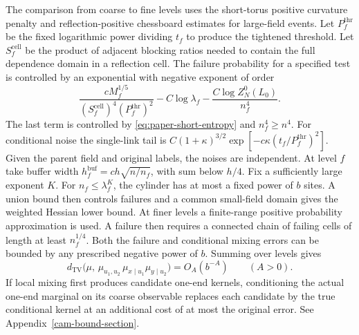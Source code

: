 \documentclass[11pt,a4paper]{article}
\numberwithin{equation}{section}
\begin{document}
The comparison from coarse to fine levels uses the short-torus positive curvature penalty and reflection-positive chessboard estimates for large-field events. Let \(P_f^{\mathrm{thr}}\) be the fixed logarithmic power dividing \(t_f\) to produce the tightened threshold. Let \(S_f^{\mathrm{cell}}\) be the product of adjacent blocking ratios needed to contain the full dependence domain in a reflection cell. The failure probability for a specified test is controlled by an exponential with negative exponent of order
\[
 \frac{cM_f^{1/5}}{(S_f^{\mathrm{cell}})^4(P_f^{\mathrm{thr}})^2}
      - C\log\lambda_f-\frac{C\log Z_N^0(L_0)}{n_f^4}.
\]
The last term is controlled by \eqref{eq:paper-short-entropy} and \(n_f^4\ge n^4\). For conditional noise the single-link tail is \(C(1+\kappa)^{3/2}\exp[-c\kappa(t_f/P_f^{\mathrm{thr}})^2]\). Given the parent field and original labels, the noises are independent. At level \(f\) take buffer width \(h_f^{\mathrm{buf}}=ch\sqrt{n/n_f}\), with sum below \(h/4\). Fix a sufficiently large exponent \(K\). For \(n_f\le\lambda_f^K\), the cylinder has at most a fixed power of \(b\) sites. A union bound then controls failures and a common small-field domain gives the weighted Hessian lower bound. At finer levels a finite-range positive probability approximation is used. A failure then requires a connected chain of failing cells of length at least \(n_f^{1/4}\). Both the failure and conditional mixing errors can be bounded by any prescribed negative power of \(b\). Summing over levels gives
\begin{equation}
 d_{\mathrm{TV}}\big(\mu,\,
    \mu_{u_1,u_2}\,\mu_{x\mid u_1}\mu_{y\mid u_2}\big)
         =O_A(b^{-A})\qquad(A>0).
 \label{eq:paper-backward}
\end{equation}
If local mixing first produces candidate one-end kernels, conditioning the actual one-end marginal on its coarse observable replaces each candidate by the true conditional kernel at an additional cost of at most the original error. See Appendix~\ref{cam-bound-section}.
\end{document}
